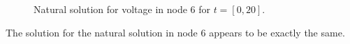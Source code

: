 \begin{figure}[H]
\hspace{-10mm}
  \caption{Natural solution for voltage in node 6 for $t=[0,20]$.} 
\end{figure}

The solution for the natural solution in node 6 appears to be exactly the same.


